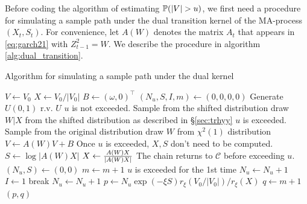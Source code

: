 Before coding the algorithm of estimating $\P(|V| > u)$, we first need
a procedure for simulating a sample path under the dual transition
kernel of the MA-process $(X_t, S_t)$. For convenience, let
$A(W)$ denotes the matrix $A_t$ that appears in \eqref{eq:garch21}
with $Z_{t-1}^2 = W$. We describe the procedure in algorithm
\ref{alg:dual_transition}.
\begin{algorithm}[htb!]
  \caption{Algorithm for simulating a sample path under the dual
    kernel}
  \label{alg:dual_transition}
  \begin{algorithmic}
    \State $V \gets V_0$
    \State $X \gets V_0 / |V_0|$
    \State $B \gets (\omega, 0)^\top$
    \State $(N_u, S, I, m) \gets (0, 0, 0, 0)$
    \Loop
    \State Generate $U(0,1)$ r.v. $U$
    \Comment $u$ is not exceeded. Sample from the shifted distribution
    \State draw $W|X$ from the shifted distribution as described in
    \S\ref{sec:trhyy}
    \Else
    \Comment $u$  is exceeded. Sample from the original distribution
    \State draw $W$ from $\chi^2(1)$ distribution
    \EndIf
    \State $V \gets A(W) V + B$
    \Comment Once $u$ is exceeded, $X, S$ don't need to be computed.
    \State $S \gets \log |A(W) X|$
    \State $X \gets {A(W) X \over |A(W) X|}$
    \EndIf
    \Comment The chain returns to $\mathcal C$ before exceeding $u$.
    \State $(N_u, S) \gets (0, 0)$
    \State $m \gets m + 1$
    \Comment $u$ is exceeded for the 1st time
    \State $N_u \gets N_u + 1$
    \State $I \gets 1$
    \EndIf
    \State break
    \State $N_u \gets N_u + 1$
    \EndIf
    \EndLoop
    \State $p \gets N_u \exp(-\xi S) r_\xi(V_0/|V_0|) / r_\xi(X)$
    \State $q \gets m + 1$
    \State \Return $(p, q)$
    \EndProcedure
  \end{algorithmic}
\end{algorithm}

